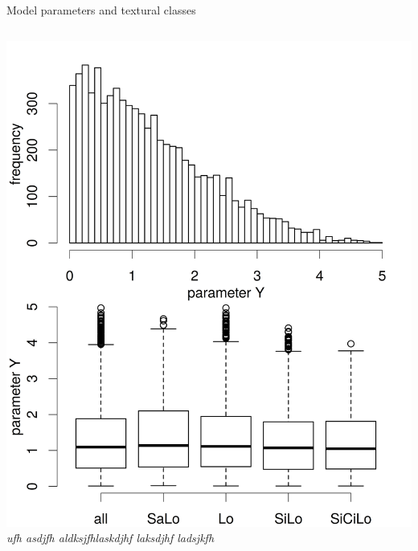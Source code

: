 \begin{block}{Model parameters and textural classes}
\begin{columns}
\begin{column}{0.25\textwidth}
            \includegraphics[width = \textwidth]{obr/mc_y.png}
            {\it ufh asdjfh aldksjfhlaskdjhf laksdjhf ladsjkfh }
        \end{column}
    \end{columns}
\end{block}















